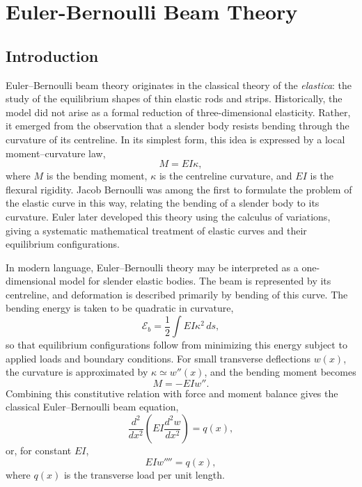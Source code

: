 \chapter{Euler-Bernoulli Beam Theory}
\label{chap:euler-bernoulli}

\section{Introduction}

Euler--Bernoulli beam theory originates in the classical theory of the
\emph{elastica}: the study of the equilibrium shapes of thin elastic rods and
strips. %
Historically, the model did not arise as a formal reduction of
three-dimensional elasticity. Rather, it emerged from the observation that a
slender body resists bending through the curvature of its centreline. In its
simplest form, this idea is expressed by a local moment--curvature law,
\begin{equation*}
	M = EI \kappa,
\end{equation*}
where \(M\) is the bending moment, \(\kappa\) is the centreline curvature,
and \(EI\) is the flexural rigidity. Jacob Bernoulli was among the first to
formulate the problem of the elastic curve in this way, relating the bending
of a slender body to its curvature. Euler later developed this theory using
the calculus of variations, giving a systematic mathematical treatment of
elastic curves and their equilibrium configurations.

In modern language, Euler--Bernoulli theory may be interpreted as a
one-dimensional model for slender elastic bodies. The beam is represented by
its centreline, and deformation is described primarily by bending of this
curve. The bending energy is taken to be quadratic in curvature,
\begin{equation*}
	\mathcal{E}_b = \frac{1}{2}\int EI \kappa^2 \, ds,
\end{equation*}
so that equilibrium configurations follow from minimizing this energy subject
to applied loads and boundary conditions. For small transverse deflections
\(w(x)\), the curvature is approximated by \(\kappa \simeq w''(x)\), and the
bending moment becomes
\begin{equation*}
	M = -EI w''.
\end{equation*}
Combining this constitutive relation with force and moment balance gives the
classical Euler--Bernoulli beam equation,
\begin{equation*}
	\frac{d^2}{dx^2}\left(EI \frac{d^2 w}{dx^2}\right) = q(x),
\end{equation*}
or, for constant \(EI\),
\begin{equation*}
	EI w'''' = q(x),
\end{equation*}
where \(q(x)\) is the transverse load per unit length.

